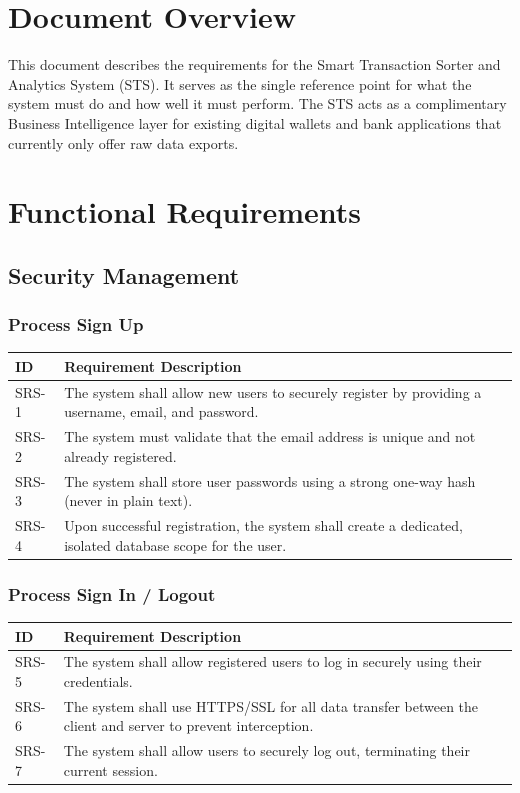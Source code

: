 \section{Document Overview}
This document describes the requirements for the Smart Transaction Sorter and Analytics System (STS). It serves as the single reference point for what the system must do and how well it must perform. The STS acts as a complimentary Business Intelligence layer for existing digital wallets and bank applications that currently only offer raw data exports.

\section{Functional Requirements}

\subsection{Security Management}

\subsubsection{Process Sign Up}
\begin{longtable}{|p{2.5cm}|p{12cm}|}
	\hline
	\textbf{ID} & \textbf{Requirement Description} \\
	\hline
	SRS-1 & The system shall allow new users to securely register by providing a username, email, and password. \\ \hline
	SRS-2 & The system must validate that the email address is unique and not already registered. \\ \hline
	SRS-3 & The system shall store user passwords using a strong one-way hash (never in plain text). \\ \hline
	SRS-4 & Upon successful registration, the system shall create a dedicated, isolated database scope for the user. \\ \hline
\end{longtable}

\subsubsection{Process Sign In / Logout}
\begin{longtable}{|p{2.5cm}|p{12cm}|}
	\hline
	\textbf{ID} & \textbf{Requirement Description} \\
	\hline
	SRS-5 & The system shall allow registered users to log in securely using their credentials. \\ \hline
	SRS-6 & The system shall use HTTPS/SSL for all data transfer between the client and server to prevent interception. \\ \hline
	SRS-7 & The system shall allow users to securely log out, terminating their current session. \\ \hline
\end{longtable}

